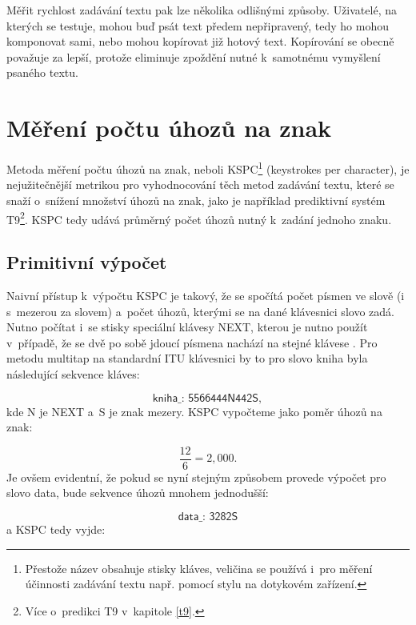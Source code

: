 \documentclass[a4paper,11pt,openany]{book} %
\newcommand\exmp{\textsf}
\begin{document}
Měřit rychlost zadávání textu pak lze několika odlišnými způsoby. Uživatelé, na kterých se testuje, mohou buď psát text předem nepřipravený, tedy ho mohou komponovat sami, nebo mohou kopírovat již hotový text. Kopírování se obecně považuje za lepší, protože eliminuje zpoždění nutné k~samotnému vymyšlení psaného textu. \parencite[2]{tarvainen2010beginner} %

\section{Měření počtu úhozů na znak}

Metoda měření počtu úhozů na znak, neboli KSPC\footnote{Přestože název obsahuje stisky kláves, veličina se používá i~pro měření účinnosti zadávání textu např. pomocí stylu na dotykovém zařízení.} (keystrokes per character), je nejužitečnější metrikou pro vyhodnocování těch metod zadávání textu, které se snaží o~snížení množství úhozů na znak, jako  je například prediktivní systém T9\footnote{Více o~predikci T9 v~kapitole \ref{t9}.}. KSPC tedy udává průměrný počet úhozů nutný k~zadání jednoho znaku.

\subsection{Primitivní výpočet}

Naivní přístup k~výpočtu KSPC je takový, že se spočítá počet písmen ve slově (i s~mezerou za slovem) a~počet úhozů, kterými se na dané klávesnici slovo zadá. Nutno počítat i~se stisky speciální klávesy \exmp{NEXT}, kterou je nutno použít v~případě, že se dvě po sobě jdoucí písmena nachází na stejné klávese \parencite[10]{silfverberg2000predicting}. %
Pro metodu multitap na standardní ITU klávesnici by to pro slovo \exmp{kniha} byla následující sekvence kláves:

\[
	\exmp{kniha\_: 5566444N442S},
\]
kde \exmp{N} je \exmp{NEXT} a~\exmp{S} je znak mezery. KSPC vypočteme jako poměr úhozů na znak:

\[
	\frac{12}{6} = 2,000.
\]
Je ovšem evidentní, že pokud se nyní stejným způsobem provede výpočet pro slovo \exmp{data}, bude sekvence úhozů mnohem jednodušší:

\[
	\exmp{data\_: 3282S}
\]
a KSPC tedy vyjde:
\end{document}

